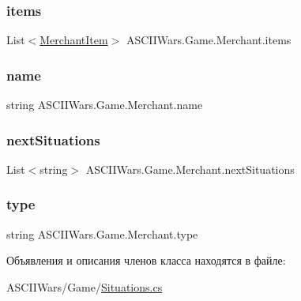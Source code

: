 \subsubsection{\texorpdfstring{items}{items}}
{\footnotesize\ttfamily List$<$\hyperlink{class_a_s_c_i_i_wars_1_1_game_1_1_merchant_item}{Merchant\+Item}$>$ A\+S\+C\+I\+I\+Wars.\+Game.\+Merchant.\+items}

\hypertarget{class_a_s_c_i_i_wars_1_1_game_1_1_merchant_ada225b0cd9c12c73b70729b821541d90}{}\label{class_a_s_c_i_i_wars_1_1_game_1_1_merchant_ada225b0cd9c12c73b70729b821541d90} 
\subsubsection{\texorpdfstring{name}{name}}
{\footnotesize\ttfamily string A\+S\+C\+I\+I\+Wars.\+Game.\+Merchant.\+name}

\hypertarget{class_a_s_c_i_i_wars_1_1_game_1_1_merchant_a882142ada4b87c08a3a6b9e1c895c7c0}{}\label{class_a_s_c_i_i_wars_1_1_game_1_1_merchant_a882142ada4b87c08a3a6b9e1c895c7c0} 
\subsubsection{\texorpdfstring{next\+Situations}{nextSituations}}
{\footnotesize\ttfamily List$<$string$>$ A\+S\+C\+I\+I\+Wars.\+Game.\+Merchant.\+next\+Situations}

\hypertarget{class_a_s_c_i_i_wars_1_1_game_1_1_merchant_a49fe8caa978e4dd0199f0b583f1c99a3}{}\label{class_a_s_c_i_i_wars_1_1_game_1_1_merchant_a49fe8caa978e4dd0199f0b583f1c99a3} 
\subsubsection{\texorpdfstring{type}{type}}
{\footnotesize\ttfamily string A\+S\+C\+I\+I\+Wars.\+Game.\+Merchant.\+type}



Объявления и описания членов класса находятся в файле\+:\begin{DoxyCompactItemize}
\item 
A\+S\+C\+I\+I\+Wars/\+Game/\hyperlink{_situations_8cs}{Situations.\+cs}\end{DoxyCompactItemize}
